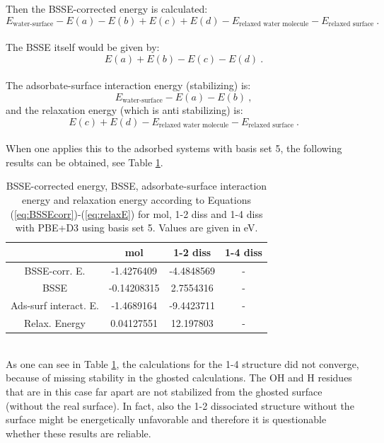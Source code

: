 \documentclass[11pt,DIV=13,BCOR=5mm,a4paper,headinclude]{scrbook}
\begin{document}
Then the BSSE-corrected energy is calculated:
\begin{equation}\label{eq:BSSEcorr}
 E_{\textrm{water-surface}}-E(a)-E(b)+E(c)+E(d)-E_{\textrm{relaxed water molecule}}-E_{\textrm{relaxed surface}} ~.
\end{equation}
\\
The BSSE itself would be given by:
\begin{equation}
 E(a)+E(b)-E(c)-E(d) ~.
\end{equation}
\\
The adsorbate-surface interaction energy (stabilizing) is:
\begin{equation}
 E_{\textrm{water-surface}}-E(a)-E(b) ~,
\end{equation}
and the relaxation energy (which is anti stabilizing) is:
\begin{equation}\label{eq:relaxE}
 E(c)+E(d)-E_{\textrm{relaxed water molecule}}-E_{\textrm{relaxed surface}} ~.
\end{equation}
\\
When one applies this to the adsorbed systems with basis set 5, the following results can be obtained, see Table \ref{tab:bsse-results}.
\begin{table}[!h]
  \centering
   \caption{BSSE-corrected energy, BSSE, adsorbate-surface interaction energy and relaxation energy according to Equations (\ref{eq:BSSEcorr})-(\ref{eq:relaxE}) for mol, 1-2 diss and 1-4 diss with PBE+D3 using basis set 5.
Values are given in eV.}
  \begin{tabular}{c|ccc}
  \toprule
			& mol  & 1-2 diss & 1-4 diss \\\midrule
  BSSE-corr. E.		&-1.4276409 &-4.4848569 & -\\
  BSSE			&-0.14208315&2.7554316 & -\\
  Ads-surf interact. E.	&-1.4689164 &-9.4423711 & -\\
  Relax. Energy		&0.04127551 &12.197803 & -\\\bottomrule
  \end{tabular}
  \label{tab:bsse-results}
 \end{table}
 \\
As one can see in Table \ref{tab:bsse-results}, the calculations for the 1-4 structure did not converge, because of missing stability in the ghosted calculations.
The OH and H residues that are in this case far apart are not stabilized from the ghosted surface (without the real surface).
In fact, also the 1-2 dissociated structure without the surface might be energetically unfavorable and therefore it is questionable whether these results are reliable.
\end{document}
